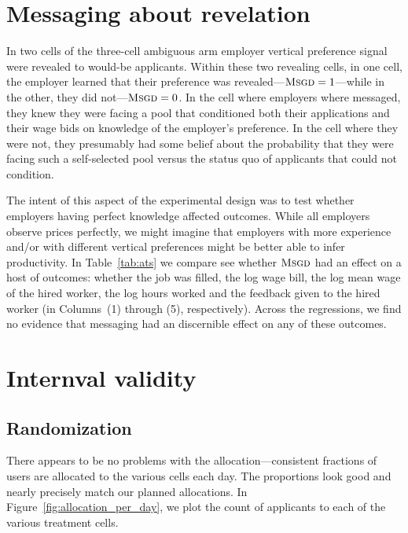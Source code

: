 \section{Messaging about revelation}
\label{sec:messaging} 
In two cells of the three-cell ambiguous arm employer vertical preference signal were revealed to would-be applicants.
Within these two revealing cells, in one cell, the employer learned that their preference was revealed---$\textsc{Msgd} = 1$---while in the other, they did not---$\textsc{Msgd} = 0$.
In the cell where employers where messaged, they knew they were facing a pool that conditioned both their applications and their wage bids on knowledge of the employer's preference.
In the cell where they were not, they presumably had some belief about the probability that they were facing such a self-selected pool versus the status quo of applicants that could not condition.   

The intent of this aspect of the experimental design was to test whether employers having perfect knowledge affected outcomes.
While all employers observe prices perfectly, we might imagine that employers with more experience and/or with different vertical preferences might be better able to infer productivity.
In Table~\ref{tab:ats} we compare see whether $\textsc{Msgd}$ had an effect on a host of outcomes:
whether the job was filled, the log wage bill, the log mean wage of the hired worker, the log hours worked and the feedback given to the hired worker (in Columns~(1) through (5), respectively).
Across the regressions, we find no evidence that messaging had an discernible effect on any of these outcomes.  

{\tiny
 
}


\section{Internval validity}

\subsection{Randomization} \label{sec:balance} 

There appears to be no problems with the allocation---consistent fractions of users are allocated to the various cells each day.  
The proportions look good and nearly precisely match our planned allocations. 
In Figure~\ref{fig:allocation_per_day}, we plot the count of applicants to each of the various treatment cells. 

